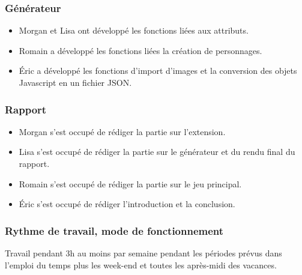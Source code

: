 \documentclass{article}
\begin{document}
            \subsubsection{Générateur}
                \begin{itemize}
                    \item Morgan et Lisa ont développé les fonctions liées aux attributs.
                    \item Romain a développé les fonctions liées la création de personnages.
                    \item Éric a développé les fonctions d'import d’images et la conversion des objets Javascript en un fichier JSON.
                \end{itemize}
            
            \subsubsection{Rapport}
                \begin{itemize}
                    \item Morgan s'est occupé de rédiger la partie sur l'extension.
                    \item Lisa s'est occupé de rédiger la partie sur le générateur et du rendu final du rapport.
                    \item Romain s'est occupé de rédiger la partie sur le jeu principal.
                    \item Éric s'est occupé de rédiger l'introduction et la conclusion.
                \end{itemize}
                
            \subsubsection{Rythme de travail, mode de fonctionnement}
                Travail pendant 3h au moins par semaine pendant les périodes prévus dans l’emploi du temps plus les week-end et toutes les après-midi des vacances.
    \pagebreak
    
\end{document}
